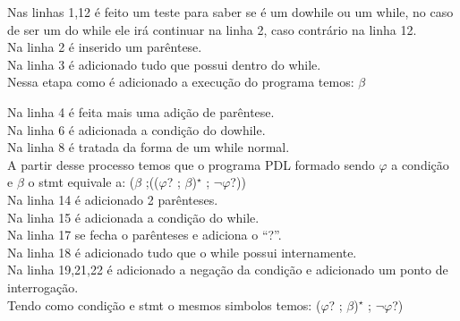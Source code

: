 \documentclass{article}
\newcommand\bruno[1]{({\color{red}#1})}
\begin{document}
	\begin{algorithm}[H]
		
	\end{algorithm}
	\begin{flushleft}
	Nas linhas 1,12 é feito um teste para saber se é um dowhile ou um while, no caso de ser um do while ele irá continuar na linha 2, caso contrário na linha 12.\\
	Na linha 2 é inserido um parêntese.\\
	Na linha 3 é adicionado tudo que possui dentro do while.\\
	Nessa etapa como é adicionado a execução do programa temos: $\beta$
	
	Na linha 4 é feita mais uma adição de parêntese.\\
	Na linha 6 é adicionada a condição do dowhile.\\
	Na linha 8 é tratada da forma de um while normal.\\
	\BlankLine
	A partir desse processo temos que o programa PDL formado sendo $\varphi$ a condição e $\beta$ o stmt equivale a: ($\beta$ ;(($\varphi$? ; $\beta$)$^\star$ ; $\neg$$\varphi$?)) \\
	\BlankLine
	Na linha 14 é adicionado 2 parênteses.\\
	Na linha 15 é adicionada a condição do while.\\
	Na linha 17 se fecha o parênteses e adiciona o “?”. \\
	Na linha 18 é adicionado tudo que o while possui internamente.\\
	Na linha 19,21,22 é adicionado a negação da condição e adicionado um ponto de interrogação.\\
	Tendo como condição e stmt o mesmos simbolos temos:  ($\varphi$? ; $\beta$)$^\star$ ; $\neg$$\varphi$?)\\
	
	\end{flushleft} %
	
\end{document}
